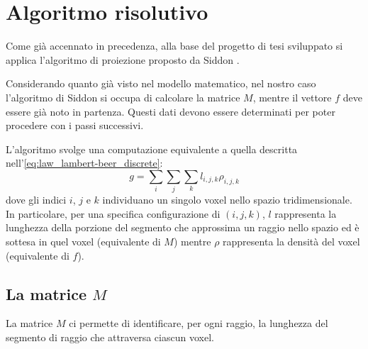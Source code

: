 \documentclass[12pt,a4paper]{report}
\begin{document}
\section{Algoritmo risolutivo}

Come già accennato in precedenza, alla base del progetto di tesi sviluppato si applica l'algoritmo di proiezione proposto da
Siddon \cite{Siddon1984}.

Considerando quanto già visto nel modello matematico, nel nostro caso l'algoritmo di Siddon si occupa di calcolare la matrice
\(M\), mentre il vettore \(f\) deve essere già noto in partenza.
Questi dati devono essere determinati per poter procedere con i passi successivi.

L'algoritmo svolge una computazione equivalente a quella descritta nell'\autoref{eq:law_lambert-beer_discrete}:
\begin{equation} \label{eq:law_lambert-beer_Siddon}
  g = \sum_i \sum_j \sum_k l_{i, j, k} \rho_{i, j, k}
\end{equation}
dove gli indici \(i\), \(j\) e \(k\) individuano un singolo voxel nello spazio tridimensionale.
In particolare, per una specifica configurazione di \((i, j, k)\), \(l\) rappresenta la lunghezza della porzione del segmento che
approssima un raggio nello spazio ed è sottesa in quel voxel (equivalente di \(M\)) mentre \(\rho\) rappresenta la densità del
voxel (equivalente di \(f\)).

\subsection{La matrice \texorpdfstring{\(M\)}{M}}

La matrice \(M\) ci permette di identificare, per ogni raggio, la lunghezza del segmento di raggio che attraversa ciascun voxel.
\end{document}
